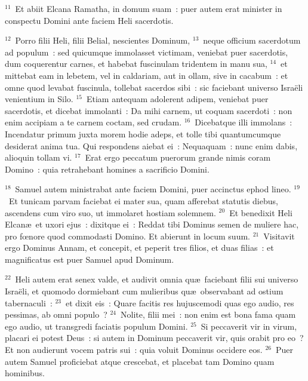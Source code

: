 ${}^{11}$~Et abiit Elcana Ramatha, in domum suam~: puer autem erat minister in conspectu Domini ante faciem Heli sacerdotis.


${}^{12}$~Porro filii Heli, filii Belial, nescientes Dominum,
${}^{13}$~neque officium sacerdotum ad populum~: sed quicumque immolasset victimam, veniebat puer sacerdotis, dum coquerentur carnes, et habebat fuscinulam tridentem in manu sua,
${}^{14}$~et mittebat eam in lebetem, vel in caldariam, aut in ollam, sive in cacabum~: et omne quod levabat fuscinula, tollebat sacerdos sibi~: sic faciebant universo Isra\"eli venientium in Silo.
${}^{15}$~Etiam antequam adolerent adipem, veniebat puer sacerdotis, et dicebat immolanti~: Da mihi carnem, ut coquam sacerdoti~: non enim accipiam a te carnem coctam, sed crudam.
${}^{16}$~Dicebatque illi immolans~: Incendatur primum juxta morem hodie adeps, et tolle tibi quantumcumque desiderat anima tua. Qui respondens aiebat ei~: Nequaquam~: nunc enim dabis, alioquin tollam vi.
${}^{17}$~Erat ergo peccatum puerorum grande nimis coram Domino~: quia retrahebant homines a sacrificio Domini.


${}^{18}$~Samuel autem ministrabat ante faciem Domini, puer accinctus ephod lineo.
${}^{19}$~Et tunicam parvam faciebat ei mater sua, quam afferebat statutis diebus, ascendens cum viro suo, ut immolaret hostiam solemnem.
${}^{20}$~Et benedixit Heli Elcan\ae\ et uxori ejus~: dixitque ei~: Reddat tibi Dominus semen de muliere hac, pro fœnore quod commodasti Domino. Et abierunt in locum suum.
${}^{21}$~Visitavit ergo Dominus Annam, et concepit, et peperit tres filios, et duas filias~: et magnificatus est puer Samuel apud Dominum.


${}^{22}$~Heli autem erat senex valde, et audivit omnia qu\ae\ faciebant filii sui universo Isra\"eli, et quomodo dormiebant cum mulieribus qu\ae\ observabant ad ostium tabernaculi~:
${}^{23}$~et dixit eis~: Quare facitis res hujuscemodi quas ego audio, res pessimas, ab omni populo~?
${}^{24}$~Nolite, filii mei~: non enim est bona fama quam ego audio, ut transgredi faciatis populum Domini.
${}^{25}$~Si peccaverit vir in virum, placari ei potest Deus~: si autem in Dominum peccaverit vir, quis orabit pro eo~? Et non audierunt vocem patris sui~: quia voluit Dominus occidere eos.
${}^{26}$~Puer autem Samuel proficiebat atque crescebat, et placebat tam Domino quam hominibus.


